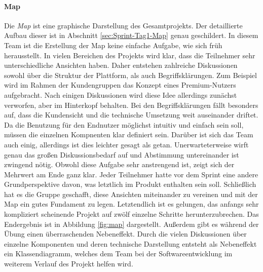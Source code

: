 \paragraph{Map}
Die \textit{Map} ist eine graphische Darstellung des Gesamtprojekts. Der detaillierte Aufbau dieser ist in Abschnitt \ref{sec:Sprint-Tag1-Map} genau geschildert. 
In diesem Team ist die Erstellung der Map keine einfache Aufgabe, wie sich früh herausstellt. In vielen Bereichen des Projekts wird klar, dass die Teilnehmer sehr unterschiedliche Ansichten haben. Daher entstehen zahlreiche Diskussionen sowohl über die Struktur der Plattform, als auch Begriffsklärungen. Zum Beispiel wird im Rahmen der Kundengruppen das Konzept eines Premium-Nutzers aufgebracht. Nach einigen Diskussionen wird diese Idee allerdings zunächst verworfen, aber im Hinterkopf behalten. Bei den Begriffsklärungen fällt besonders auf, dass die Kundensicht und die technische Umsetzung weit auseinander driftet. Da die Benutzung für den Endnutzer möglichst intuitiv und einfach sein soll, müssen die einzelnen Kompnenten klar definiert sein. Darüber ist sich das Team auch einig, allerdings ist dies leichter gesagt als getan. Unerwarteterweise wirft genau das großen Diskussionsbedarf auf und Abstimmung untereinander ist zwingend nötig. Obwohl diese Aufgabe sehr anstrengend ist, zeigt sich der Mehrwert am Ende ganz klar. Jeder Teilnehmer hatte vor dem Sprint eine andere Grundperspektive davon, was letztlich im Produkt enthalten sein soll. Schließlich hat es die Gruppe geschafft, diese Ansichten miteinander zu vereinen und mit der Map ein gutes Fundament zu legen. Letztendlich ist es gelungen, das anfangs sehr kompliziert scheinende Projekt auf zwölf einzelne Schritte herunterzubrechen. Das Endergebnis ist in Abbildung \ref{fig:map} dargestellt. Außerdem gibt es während der Übung einen überraschenden Nebeneffekt. Durch die vielen Diskussionen über einzelne Komponenten und deren technische Darstellung entsteht als Nebeneffekt ein Klassendiagramm, welches dem Team bei der Softwareentwicklung im weiterem Verlauf des Projekt helfen wird.

